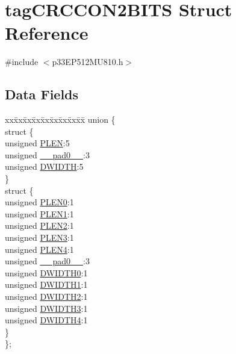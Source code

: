 \hypertarget{structtag_c_r_c_c_o_n2_b_i_t_s}{}\section{tag\+C\+R\+C\+C\+O\+N2\+B\+I\+TS Struct Reference}
\label{structtag_c_r_c_c_o_n2_b_i_t_s}


{\ttfamily \#include $<$p33\+E\+P512\+M\+U810.\+h$>$}

\subsection*{Data Fields}
\begin{DoxyCompactItemize}
\item 
\begin{tabbing}
xx\=xx\=xx\=xx\=xx\=xx\=xx\=xx\=xx\=\kill
union \{\\
\>struct \{\\
\>\>unsigned \hyperlink{structtag_c_r_c_c_o_n2_b_i_t_s_a3f718a974075a68b65409c3b50d5a810}{PLEN}:5\\
\>\>unsigned \hyperlink{structtag_c_r_c_c_o_n2_b_i_t_s_adf71f3d8410c1f1dbbc96680a92c49af}{\_\_pad0\_\_}:3\\
\>\>unsigned \hyperlink{structtag_c_r_c_c_o_n2_b_i_t_s_ae45661d214e03bb3ac0332adfb6841f7}{DWIDTH}:5\\
\>\} \\
\>struct \{\\
\>\>unsigned \hyperlink{structtag_c_r_c_c_o_n2_b_i_t_s_aa0cefa95f61d27c73f01bb51e99d8776}{PLEN0}:1\\
\>\>unsigned \hyperlink{structtag_c_r_c_c_o_n2_b_i_t_s_a96c104f4804ed9919a69d41d297da11f}{PLEN1}:1\\
\>\>unsigned \hyperlink{structtag_c_r_c_c_o_n2_b_i_t_s_a8faa90ee551d1c60f01c7eac1113a7dc}{PLEN2}:1\\
\>\>unsigned \hyperlink{structtag_c_r_c_c_o_n2_b_i_t_s_a49b31493ee6304118f584535462d15b3}{PLEN3}:1\\
\>\>unsigned \hyperlink{structtag_c_r_c_c_o_n2_b_i_t_s_a782eba6f760da4a0c40dbab45d487931}{PLEN4}:1\\
\>\>unsigned \hyperlink{structtag_c_r_c_c_o_n2_b_i_t_s_adf71f3d8410c1f1dbbc96680a92c49af}{\_\_pad0\_\_}:3\\
\>\>unsigned \hyperlink{structtag_c_r_c_c_o_n2_b_i_t_s_a9912ffae526defc383aff1c088e322ef}{DWIDTH0}:1\\
\>\>unsigned \hyperlink{structtag_c_r_c_c_o_n2_b_i_t_s_abb4dcb9147506c7d0bfb851dd2af8a1a}{DWIDTH1}:1\\
\>\>unsigned \hyperlink{structtag_c_r_c_c_o_n2_b_i_t_s_a8de893406b2ecad97a9f2949ca92c75f}{DWIDTH2}:1\\
\>\>unsigned \hyperlink{structtag_c_r_c_c_o_n2_b_i_t_s_a93f892dcd83bf762245ab5ac912ee4c3}{DWIDTH3}:1\\
\>\>unsigned \hyperlink{structtag_c_r_c_c_o_n2_b_i_t_s_a7efaff14cee84f7051faa20a41fb34a5}{DWIDTH4}:1\\
\>\} \\
\}; \\


\end{tabbing}
\end{DoxyCompactItemize}

